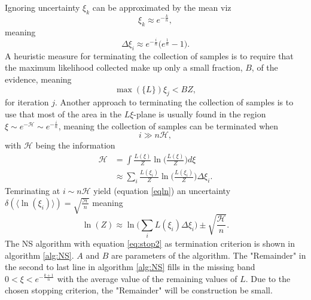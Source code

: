 Ignoring uncertainty $\xi_k$ can be approximated by the mean viz
\begin{equation}
	\xi_k\approx e^{-\frac{k}{n}},
\end{equation}
meaning
\begin{equation}
	\Delta \xi_i\approx e^{-\frac{i}{n}}\big(e^{\frac{1}{n}}-1\big).
\end{equation}
A heuristic measure for terminating the collection of samples is to require that the maximum likelihood collected make up only a small fraction, $B$, of the evidence, meaning
\begin{equation}
	\max(\{L\})\xi_j < BZ,
\end{equation}
for iteration $j$. Another approach to terminating the collection of samples is to use that most of the area in the $L\xi$-plane is usually found in the region~\citep{skilling2004,skilling2006} $\xi \sim e^{-\mathcal{H}}\sim e^{-\frac{i}{n}}$, meaning the collection of samples can be terminated when
\begin{equation}
	i\gg n\mathcal{H},
	\label{eq:stop2}
\end{equation}
with $\mathcal{H}$ being the information~\citep{skilling2004}
\begin{equation}
	\begin{split}
		\mathcal{H} &= \int \frac{L(\xi)}{Z}\ln\bigg(\frac{L(\xi)}{Z}\bigg)d\xi\\
		& \approx \sum_i\frac{L(\xi_i)}{Z}\ln\bigg(\frac{L(\xi_i)}{Z}\bigg)\Delta \xi_i.
	\end{split}
\end{equation}
Temrinating at $i\sim n\mathcal{H}$ yield (equation \eqref{eqln}) an uncertainty $\delta (\langle\ln(\xi_i)\rangle)=\sqrt{\frac{\mathcal{H}}{n}}$ meaning
\begin{equation}
	\ln(Z)\approx \ln\bigg(\sum_{i}L(\xi_i)\Delta \xi_i\bigg)\pm \sqrt{\frac{\mathcal{H}}{n}}.
\end{equation}
The NS algorithm with equation \eqref{eq:stop2} as termination criterion is shown in algorithm \ref{alg:NS}. $A$ and $B$ are parameters of the algorithm. The "Remainder" in the second to last line in algorithm \ref{alg:NS} fills in the missing band $0<\xi<e^{-\frac{k+1}{n}}$ with the average value of the remaining values of $L$. Due to the chosen stopping criterion, the "Remainder" will be construction be small.


